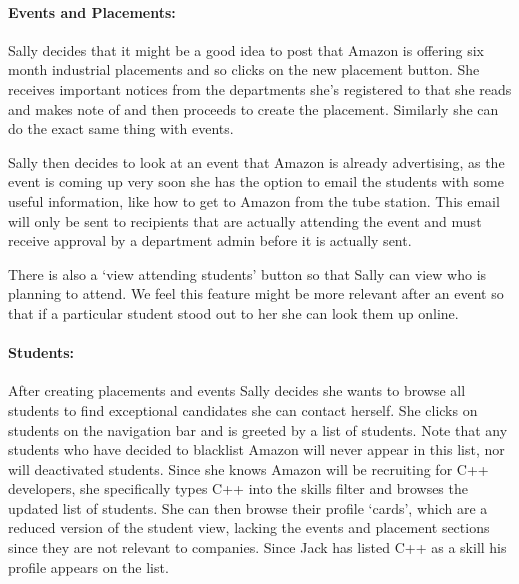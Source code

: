  \paragraph{Events and Placements:}
    Sally decides that it might be a good idea to post that Amazon is offering six month industrial placements and so clicks on the new placement button. 
    She receives important notices from the departments she's registered to that she reads and makes note of and then proceeds to create the placement.
    Similarly she can do the exact same thing with events.

    Sally then decides to look at an event that Amazon is already advertising, as the event is coming up very soon she has the option to email the students with some useful information, like how to get to Amazon from the tube station.
    This email will only be sent to recipients that are actually attending the event and must receive approval by a department admin before it is actually sent.

    There is also a `view attending students' button so that Sally can view who is planning to attend. We feel this feature might be more relevant after an event so that if a particular student stood out to her she can look them up online.
  
  \paragraph{Students:}
    After creating placements and events Sally decides she wants to browse all students to find exceptional candidates she can contact herself. She clicks on students on the navigation bar and is greeted by a list of students. Note that any students who have decided to blacklist Amazon will never appear in this list, nor will deactivated students.
    Since she knows Amazon will be recruiting for C++ developers, she specifically types C++ into the skills filter
    and browses the updated list of students.
    She can then browse their profile `cards', which are a reduced version of the student view, lacking the events and placement sections since they are not relevant to companies. Since Jack has listed C++ as a skill his profile appears on the list.

